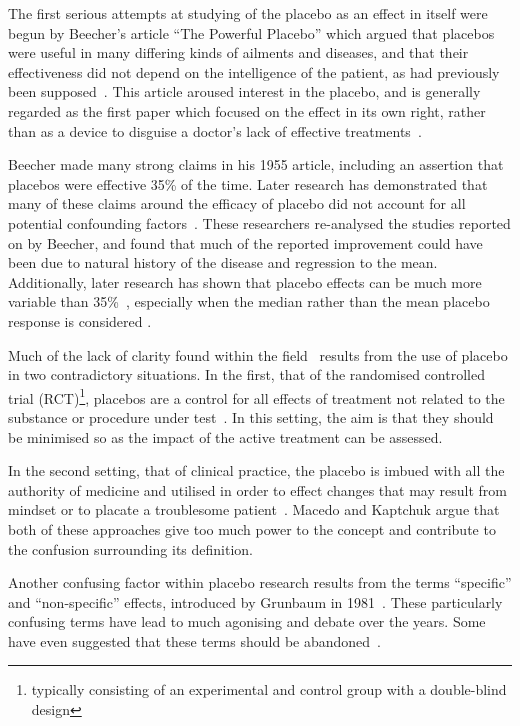The first serious attempts at studying of the placebo as an effect in itself  were begun by Beecher's article ``The Powerful Placebo'' which argued that placebos were useful in many differing kinds of ailments and diseases, and that their effectiveness did not depend on the intelligence of the patient, as had previously been supposed~\cite{beecher1955powerful}.  This article aroused interest in the placebo, and is generally regarded as the first paper which focused on the effect in its own right, rather than as a device to disguise a doctor's lack of effective treatments~\cite{beecher1955powerful,Kaptchuk1998}. 

Beecher made many strong claims in his 1955 article, including an assertion that placebos were effective 35\% of the time. Later research has demonstrated that many of these claims around the efficacy of placebo did not account for all potential confounding factors~\cite{Kienle1998}. These researchers re-analysed the studies reported on by Beecher, and found that much of the reported improvement could have been due to natural history of the disease and regression to the mean. Additionally, later research has shown that placebo effects can be much more variable than 35\%~\cite{Turner1994}, especially when the median rather than the mean placebo response is considered \cite{McQuay1996}.   

Much of the lack of clarity found within the field~\cite{Macedo2003,Kaptchuk1998} results from the use of placebo in two contradictory situations. In the first, that of the randomised controlled trial (RCT)\footnote{typically consisting of an experimental and control group with a double-blind design}, placebos are a control for all effects of treatment not related to the substance or procedure under test~\cite{Vickers2000}. In this setting, the aim is that they should be minimised so as the impact of the active treatment can be assessed.  

In the second setting, that  of clinical practice, the placebo is imbued with all the authority of medicine and utilised in order to effect changes that may result from mindset or to placate a troublesome patient~\cite{Bootzin2003,Sherman2008}. Macedo and Kaptchuk argue that both of these approaches give too much power to the concept and contribute to the confusion surrounding its definition. 

Another confusing factor within placebo research results from the terms ``specific'' and ``non-specific'' effects, introduced by Grunbaum in 1981~\cite{grunbaum1981placebo}. These particularly confusing terms have lead to much agonising and debate over the years. Some have even suggested that these terms should be abandoned~\cite{Caspi2002}. 

